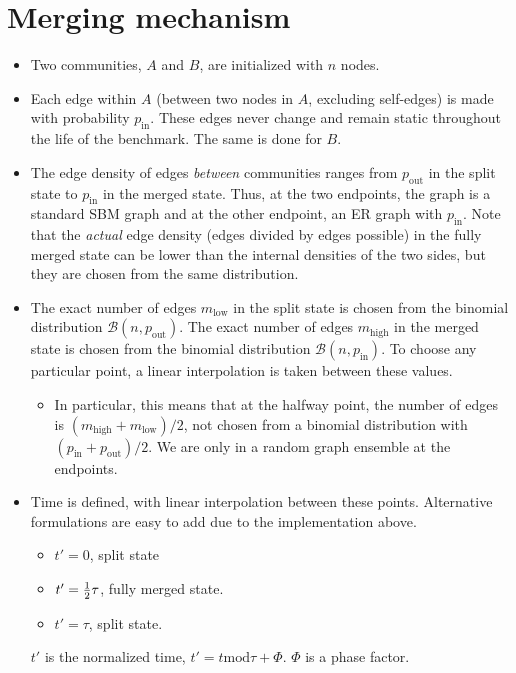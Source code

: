 \documentclass{article}
\def\pin{p_\mathrm{in}}
\def\pout{p_\mathrm{out}}
\def\low{\mathrm{low}}
\def\high{\mathrm{high}}
\begin{document}
\section{Merging mechanism}

\begin{itemize}
\item Two communities, $A$ and $B$, are initialized with $n$ nodes.
\item Each edge within $A$ (between two nodes in $A$, excluding
  self-edges) is made with probability $\pin$.  These edges never
  change and remain static throughout the life of the benchmark.  The
  same is done for $B$.
\item The edge density of edges \textsl{between} communities ranges
  from $\pout$ in the split state to $\pin$ in the merged state.
  Thus, at the two endpoints, the graph is a standard SBM graph and at
  the other endpoint, an ER graph with $\pin$.  Note that the
  \textsl{actual} edge density (edges divided by edges possible) in
  the fully merged state can be lower than the internal densities of
  the two sides, but they are chosen from the same distribution.
\item The exact number of edges $m_\low$ in the split state is chosen
  from the binomial distribution $\mathcal{B}(n, \pout)$.  The exact
  number of edges $m_\high$ in the merged state is chosen from the
  binomial distribution $\mathcal{B}(n, \pin)$.  To choose any
  particular point, a linear interpolation is taken between these
  values.
  \begin{itemize}
  \item In particular, this means that at the halfway point, the
    number of edges is $(m_\high+m_\low)/2$, not chosen from a
    binomial distribution with $(\pin+\pout)/2$.  We are only in a
    random graph ensemble at the endpoints.
  \end{itemize}
\item Time is defined, with linear interpolation between these
  points.  Alternative formulations are easy to add due to the
  implementation above.
  \begin{itemize}
  \item $t'=0$, split state
  \item $t'={1 \over 2} \tau$, fully merged state.
  \item $t'=\tau$, split state.
  \end{itemize}
  $t'$ is the normalized time, $t' = t \mathrm{mod} \tau + \Phi$.  $\Phi$ is a
  phase factor.
\end{itemize}
\end{document}
